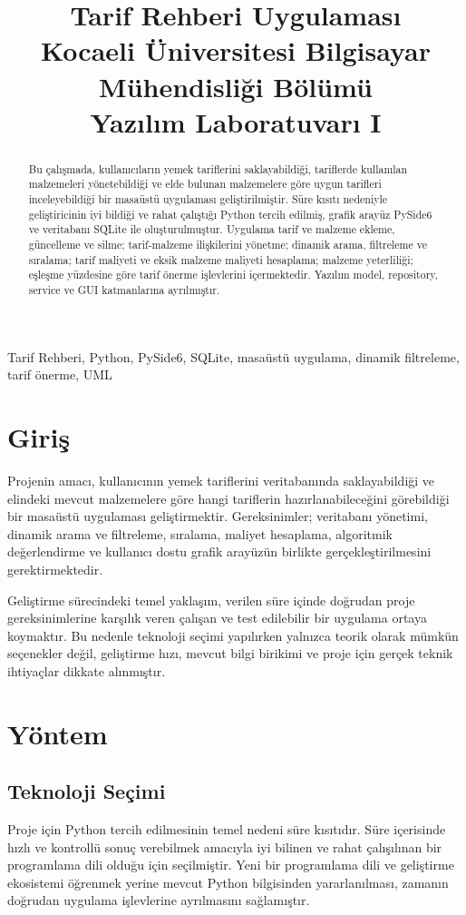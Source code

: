 \documentclass[conference]{IEEEtran}
\title{Tarif Rehberi Uygulaması\\
\large Kocaeli Üniversitesi Bilgisayar Mühendisliği Bölümü\\
Yazılım Laboratuvarı I}
\author{
\IEEEauthorblockN{Alper Aydın -- 190201064\\190201064@kocaeli.edu.tr}
\IEEEauthorblockA{Kocaeli Üniversitesi, Bilgisayar Mühendisliği Bölümü\\
Yazılım Laboratuvarı I}
}
\begin{document}
\maketitle

\begin{abstract}
Bu çalışmada, kullanıcıların yemek tariflerini saklayabildiği, tariflerde kullanılan malzemeleri yönetebildiği ve elde bulunan malzemelere göre uygun tarifleri inceleyebildiği bir masaüstü uygulaması geliştirilmiştir. Süre kısıtı nedeniyle geliştiricinin iyi bildiği ve rahat çalıştığı Python tercih edilmiş, grafik arayüz PySide6 ve veritabanı SQLite ile oluşturulmuştur. Uygulama tarif ve malzeme ekleme, güncelleme ve silme; tarif-malzeme ilişkilerini yönetme; dinamik arama, filtreleme ve sıralama; tarif maliyeti ve eksik malzeme maliyeti hesaplama; malzeme yeterliliği; eşleşme yüzdesine göre tarif önerme işlevlerini içermektedir. Yazılım model, repository, service ve GUI katmanlarına ayrılmıştır.
\end{abstract}

\begin{IEEEkeywords}
Tarif Rehberi, Python, PySide6, SQLite, masaüstü uygulama, dinamik filtreleme, tarif önerme, UML
\end{IEEEkeywords}

\section{Giriş}
Projenin amacı, kullanıcının yemek tariflerini veritabanında saklayabildiği ve elindeki mevcut malzemelere göre hangi tariflerin hazırlanabileceğini görebildiği bir masaüstü uygulaması geliştirmektir. Gereksinimler; veritabanı yönetimi, dinamik arama ve filtreleme, sıralama, maliyet hesaplama, algoritmik değerlendirme ve kullanıcı dostu grafik arayüzün birlikte gerçekleştirilmesini gerektirmektedir.

Geliştirme sürecindeki temel yaklaşım, verilen süre içinde doğrudan proje gereksinimlerine karşılık veren çalışan ve test edilebilir bir uygulama ortaya koymaktır. Bu nedenle teknoloji seçimi yapılırken yalnızca teorik olarak mümkün seçenekler değil, geliştirme hızı, mevcut bilgi birikimi ve proje için gerçek teknik ihtiyaçlar dikkate alınmıştır.

\section{Yöntem}

\subsection{Teknoloji Seçimi}
Proje için Python tercih edilmesinin temel nedeni süre kısıtıdır. Süre içerisinde hızlı ve kontrollü sonuç verebilmek amacıyla iyi bilinen ve rahat çalışılınan bir programlama dili olduğu için seçilmiştir. Yeni bir programlama dili ve geliştirme ekosistemi öğrenmek yerine mevcut Python bilgisinden yararlanılması, zamanın doğrudan uygulama işlevlerine ayrılmasını sağlamıştır.
\end{document}
